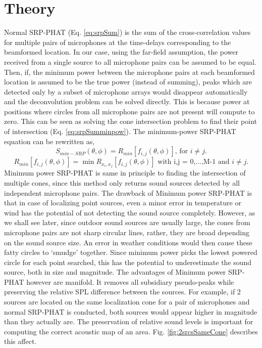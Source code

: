 \section{Theory}
Normal SRP-PHAT (Eq. \ref{eq:srpSum}) is the sum of the cross-correlation values for multiple pairs of microphones at the time-delays corresponding to the beamformed location. %
In our case, using the far-field assumption, the power received from a single source to all microphone pairs can be assumed to be equal. Then, if, the minimum power between the microphone pairs at each beamformed location is assumed to be the true power (instead of summing), peaks which are detected only by a subset of microphone arrays would disappear automatically and the deconvolution problem can be solved directly. This is because power at positions where circles from all microphone pairs are not present will compute to zero. This can be seen as solving the cone intersection problem to find their point of intersection (Eq. \ref{eq:srpSumminpow}). The minimum-power SRP-PHAT equation can be rewritten as, 
\begin{equation}
    S_{min-SRP}(\theta,\phi)={R_{min}[f_{i,j}(\theta,\phi)]} \text{, for } i\neq j.
     \label{eq:srpSumminpow}
\end{equation}
\begin{equation}
    {R_{min}[f_{i,j}(\theta,\phi)]}=\min{{R_{x_i,x_j}[f_{i,j}(\theta,\phi)]}} \text{ with  i,j = 0,...,M-1 and } i\neq j.
     \label{eq:Rminpow}
\end{equation}
Minimum power SRP-PHAT is same in principle to finding the intersection of multiple cones, since this method only returns sound sources detected by all independent microphone pairs. The drawback of Minimum power SRP-PHAT is that in case of localizing point sources, even a minor error in temperature or wind has the potential of not detecting the sound source completely. However, as we shall see later, since outdoor sound sources are usually large, the cones from microphone pairs are not sharp circular lines, rather, they are broad depending on the sound source size. An error in weather conditions would then cause these fatty circles to `smudge' together. Since minimum power picks the lowest powered circle for each point searched, this has the potential to underestimate the sound source, both in size and magnitude. The advantages of Minimum power SRP-PHAT however are manifold. It removes all subsidiary pseudo-peaks while preserving the relative SPL difference between the sources. For example, if 2 sources are located on the same localization cone for a pair of microphones and normal SRP-PHAT is conducted, both sources would appear higher in magnitude than they actually are. The preservation of relative sound levels is important for computing the correct acoustic map of an area. Fig. \ref{fig:2srcsSameCone} describes this affect. 

